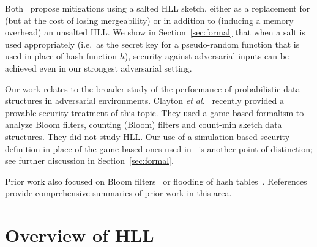 \documentclass[sigconf, anonymous, dvipsnames]{acmart} %
\begin{document}
Both~\cite{cardestprivacy,hllvuln} propose mitigations using a salted HLL sketch, either as a replacement for (but at the cost of losing mergeability) or in addition to (inducing a memory overhead) an unsalted HLL. We show in Section~\ref{sec:formal} that when a salt is used appropriately (i.e.\ as the secret key for a pseudo-random function that is used in place of hash function $h$), security against adversarial inputs can be achieved even in our strongest adversarial setting. 

Our work relates to the broader study of the performance of probabilistic data structures in adversarial environments.
Clayton \emph{et al.}~\cite{CCS:ClaPatShrPS19} recently provided a provable-security treatment of this topic. They used a game-based formalism to analyze Bloom filters, counting (Bloom) filters and count-min sketch data structures. They did not study HLL. Our use of a simulation-based security definition in place of the game-based ones used in~\cite{CCS:ClaPatShrPS19} is another point of distinction; see further discussion in Section~\ref{sec:formal}.

Prior work also focused on Bloom filters~\cite{NaorY15,GerbetKL15} or flooding of hash tables~\cite{LiptonN93,CrosbyW03}. References~\cite{GerbetKL15,CCS:ClaPatShrPS19} provide comprehensive summaries of prior work in this area. 

\section{Overview of HLL}\label{sec:overview}
\end{document}
